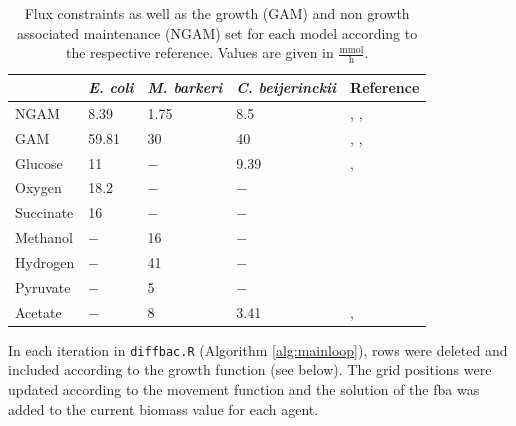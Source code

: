 \begin{table}[h!]\centering\footnotesize
\caption{Flux constraints as well as the growth (GAM) and non growth associated maintenance (NGAM) set for each model according to the respective reference. Values are given in $\frac{\mathrm{mmol}}{\mathrm{h}}$.}
\begin{tabular}{lllll}
\toprule
& \emph{E. coli} & \emph{M. barkeri} & \emph{C. beijerinckii} & Reference\\
\midrule
NGAM & 8.39 & 1.75 & 8.5 & \cite{Feist07}, \cite{Feist06}, \cite{Milne11}\\
GAM & 59.81 & 30 & 40 & \cite{Feist07}, \cite{Feist06}, \cite{Milne11}\\
Glucose & 11 & $-$ & 9.39 & \cite{Feist07}, \cite{Milne11}\\
Oxygen & 18.2 & $-$ & $-$ & \cite{Feist07}\\
Succinate & 16 & $-$ & $-$ & \cite{Orth11}\\
Methanol & $-$ & 16 & $-$ & \cite{Feist06}\\
Hydrogen & $-$ & 41 & $-$ & \cite{Feist06}\\
Pyruvate & $-$ & 5 & $-$ & \cite{Feist06}\\
Acetate & $-$ & 8 & 3.41 & \cite{Feist06}, \cite{Milne11}\\
\bottomrule 
\end{tabular} 
\label{tab:const}
\end{table}

In each iteration in \texttt{diffbac.R} (Algorithm \hyperref[alg:mainloop]{\ref{alg:mainloop}}), rows were deleted and included according to the growth function (see below). The grid positions were updated according to the movement function and the solution of the fba was added to the current biomass value for each agent.

